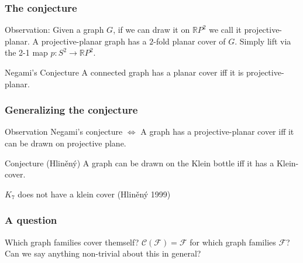 \documentclass{beamer}
\begin{document}
\begin{frame}
\frametitle{The conjecture}
Observation: Given a graph $G$, if we can draw it on $\mathbb{R}P^2$ we call it projective-planar. A projective-planar graph has a $2$-fold planar cover of $G$. Simply lift via the 2-1 map $p:S^2 \rightarrow \mathbb{R}P^2$.
\begin{block}{Negami's Conjecture}
	A connected graph has a planar cover iff it is projective-planar.
\end{block}

\end{frame}

\begin{frame}
\frametitle{Generalizing the conjecture}
\begin{block}{Observation}
	Negami's conjecture $\Longleftrightarrow$ A graph has a projective-planar cover iff it can be drawn on projective plane.
\end{block}

\begin{block}{Conjecture (Hliněný)}
	A graph can be drawn on the Klein bottle iff it has a Klein-cover.
\end{block}

\begin{example}
	$K_7$ does not have a klein cover (Hliněný 1999)
\end{example}

\end{frame}


\begin{frame}
\frametitle{A question}
\begin{block}{Which graph families cover themself?}
	$\mathcal{C}(\mathcal{F}) = \mathcal{F}$ for which graph families $\mathcal{F}$? Can we say anything non-trivial about this in general? 
\end{block}
\end{frame}
\end{document}
